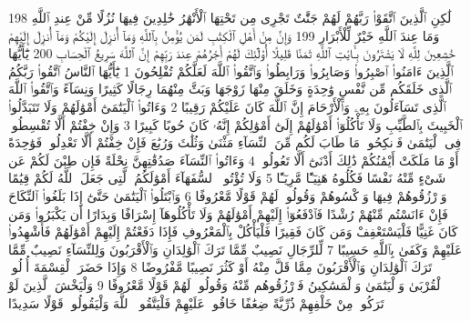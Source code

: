 {\tiny\colorbox{cl_aya}{198}} لَٰكِنِ ٱلَّذِينَ ٱتَّقَوْا۟ رَبَّهُمْ لَهُمْ جَنَّٰتٌ تَجْرِى مِن تَحْتِهَا ٱلْأَنْهَٰرُ خَٰلِدِينَ فِيهَا نُزُلًا مِّنْ عِندِ ٱللَّهِ وَمَا عِندَ ٱللَّهِ خَيْرٌ لِّلْأَبْرَارِ
{\tiny\colorbox{cl_aya}{199}} وَإِنَّ مِنْ أَهْلِ ٱلْكِتَٰبِ لَمَن يُؤْمِنُ بِٱللَّهِ وَمَآ أُنزِلَ إِلَيْكُمْ وَمَآ أُنزِلَ إِلَيْهِمْ خَٰشِعِينَ لِلَّهِ لَا يَشْتَرُونَ بِـَٔايَٰتِ ٱللَّهِ ثَمَنًا قَلِيلًا أُو۟لَٰٓئِكَ لَهُمْ أَجْرُهُمْ عِندَ رَبِّهِمْ إِنَّ ٱللَّهَ سَرِيعُ ٱلْحِسَابِ
{\tiny\colorbox{cl_aya}{200}} يَٰٓأَيُّهَا ٱلَّذِينَ ءَامَنُوا۟ ٱصْبِرُوا۟ وَصَابِرُوا۟ وَرَابِطُوا۟ وَٱتَّقُوا۟ ٱللَّهَ لَعَلَّكُمْ تُفْلِحُونَ
{\tiny\colorbox{cl_aya}{1}} يَٰٓأَيُّهَا ٱلنَّاسُ ٱتَّقُوا۟ رَبَّكُمُ ٱلَّذِى خَلَقَكُم مِّن نَّفْسٍ وَٰحِدَةٍ وَخَلَقَ مِنْهَا زَوْجَهَا وَبَثَّ مِنْهُمَا رِجَالًا كَثِيرًا وَنِسَآءً وَٱتَّقُوا۟ ٱللَّهَ ٱلَّذِى تَسَآءَلُونَ بِهِۦ وَٱلْأَرْحَامَ إِنَّ ٱللَّهَ كَانَ عَلَيْكُمْ رَقِيبًا
{\tiny\colorbox{cl_aya}{2}} وَءَاتُوا۟ ٱلْيَتَٰمَىٰٓ أَمْوَٰلَهُمْ وَلَا تَتَبَدَّلُوا۟ ٱلْخَبِيثَ بِٱلطَّيِّبِ وَلَا تَأْكُلُوٓا۟ أَمْوَٰلَهُمْ إِلَىٰٓ أَمْوَٰلِكُمْ إِنَّهُۥ كَانَ حُوبًا كَبِيرًا
{\tiny\colorbox{cl_aya}{3}} وَإِنْ خِفْتُمْ أَلَّا تُقْسِطُوا۟ فِى ٱلْيَتَٰمَىٰ فَٱنكِحُوا۟ مَا طَابَ لَكُم مِّنَ ٱلنِّسَآءِ مَثْنَىٰ وَثُلَٰثَ وَرُبَٰعَ فَإِنْ خِفْتُمْ أَلَّا تَعْدِلُوا۟ فَوَٰحِدَةً أَوْ مَا مَلَكَتْ أَيْمَٰنُكُمْ ذَٰلِكَ أَدْنَىٰٓ أَلَّا تَعُولُوا۟
{\tiny\colorbox{cl_aya}{4}} وَءَاتُوا۟ ٱلنِّسَآءَ صَدُقَٰتِهِنَّ نِحْلَةً فَإِن طِبْنَ لَكُمْ عَن شَىْءٍ مِّنْهُ نَفْسًا فَكُلُوهُ هَنِيٓـًٔا مَّرِيٓـًٔا
{\tiny\colorbox{cl_aya}{5}} وَلَا تُؤْتُوا۟ ٱلسُّفَهَآءَ أَمْوَٰلَكُمُ ٱلَّتِى جَعَلَ ٱللَّهُ لَكُمْ قِيَٰمًا وَٱرْزُقُوهُمْ فِيهَا وَٱكْسُوهُمْ وَقُولُوا۟ لَهُمْ قَوْلًا مَّعْرُوفًا
{\tiny\colorbox{cl_aya}{6}} وَٱبْتَلُوا۟ ٱلْيَتَٰمَىٰ حَتَّىٰٓ إِذَا بَلَغُوا۟ ٱلنِّكَاحَ فَإِنْ ءَانَسْتُم مِّنْهُمْ رُشْدًا فَٱدْفَعُوٓا۟ إِلَيْهِمْ أَمْوَٰلَهُمْ وَلَا تَأْكُلُوهَآ إِسْرَافًا وَبِدَارًا أَن يَكْبَرُوا۟ وَمَن كَانَ غَنِيًّا فَلْيَسْتَعْفِفْ وَمَن كَانَ فَقِيرًا فَلْيَأْكُلْ بِٱلْمَعْرُوفِ فَإِذَا دَفَعْتُمْ إِلَيْهِمْ أَمْوَٰلَهُمْ فَأَشْهِدُوا۟ عَلَيْهِمْ وَكَفَىٰ بِٱللَّهِ حَسِيبًا
{\tiny\colorbox{cl_aya}{7}} لِّلرِّجَالِ نَصِيبٌ مِّمَّا تَرَكَ ٱلْوَٰلِدَانِ وَٱلْأَقْرَبُونَ وَلِلنِّسَآءِ نَصِيبٌ مِّمَّا تَرَكَ ٱلْوَٰلِدَانِ وَٱلْأَقْرَبُونَ مِمَّا قَلَّ مِنْهُ أَوْ كَثُرَ نَصِيبًا مَّفْرُوضًا
{\tiny\colorbox{cl_aya}{8}} وَإِذَا حَضَرَ ٱلْقِسْمَةَ أُو۟لُوا۟ ٱلْقُرْبَىٰ وَٱلْيَتَٰمَىٰ وَٱلْمَسَٰكِينُ فَٱرْزُقُوهُم مِّنْهُ وَقُولُوا۟ لَهُمْ قَوْلًا مَّعْرُوفًا
{\tiny\colorbox{cl_aya}{9}} وَلْيَخْشَ ٱلَّذِينَ لَوْ تَرَكُوا۟ مِنْ خَلْفِهِمْ ذُرِّيَّةً ضِعَٰفًا خَافُوا۟ عَلَيْهِمْ فَلْيَتَّقُوا۟ ٱللَّهَ وَلْيَقُولُوا۟ قَوْلًا سَدِيدًا
